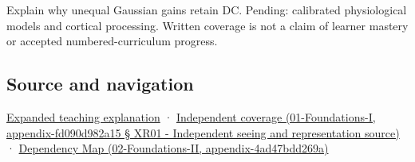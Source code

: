 Explain why unequal Gaussian gains retain DC. Pending: calibrated physiological models and cortical processing. Written coverage is not a claim of learner mastery or accepted numbered-curriculum progress.

\subsection{Source and navigation}\label{source-and-navigation}

\href{Continuous\%20Notes/University\%20-\%20Worlds,\%20Images\%20and\%20Inference\%20-\%20Graphics,\%20Vision\%20and\%20Photography\#The\%20eye\%20is\%20an\%20optical\%20instrument\%20with\%20neural\%20processing\%20inside\%20it}{Expanded teaching explanation} · \href{}{Independent coverage (01-Foundations-I, appendix-fd090d982a15 § XR01 - Independent seeing and representation source)} · \href{}{Dependency Map (02-Foundations-II, appendix-4ad47bdd269a)}
